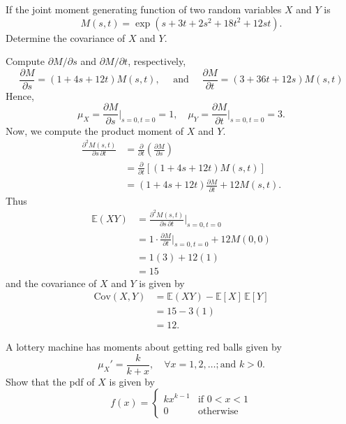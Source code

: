 \begin{example}
    If the joint moment generating function of two random variables $X$ and 
    $Y$ is 
    \[
        M(s, t) = \exp \left( s + 3t + 2s^2 + 18t^2 + 12st \right).
    \]
    Determine the covariance of $X$ and $Y$.
\end{example}
\begin{solution}
    Compute $\partial M/ \partial s$ and $\partial M/ \partial t$, respectively,
    \[
        \frac{\partial M}{\partial s} = (1 + 4s + 12t) M(s,t), \quad \text{ and } \quad 
        \frac{\partial M}{\partial t} = (3 + 36t + 12s) M(s,t)
    \]
    Hence, 
    \[
        \mu_X = \frac{\partial M}{\partial s} \big \vert_{s=0, t=0} = 1, \quad 
        \mu_Y = \frac{\partial M}{\partial t} \big \vert_{s=0, t=0} = 3.
    \]
    Now, we compute the product moment of $X$ and $Y$.
    \begin{align*}
        \frac{\partial^2 M(s,t)}{\partial s\, \partial t} &= 
        \frac{\partial}{\partial t} \left( \frac{\partial M}{\partial s} \right)\\
        &= \frac{\partial}{\partial t} \left[ (1 + 4s + 12t) M(s,t) \right]\\
        &= (1 + 4s + 12t) \frac{\partial M}{\partial t} + 12 M(s,t).
    \end{align*}
    Thus
    \begin{align*}
        \mathbb{E}(XY) &= \frac{\partial^2 M(s,t)}{\partial s\, \partial t} \bigg \vert_{s=0, t=0}\\ 
        &= 1 \cdot \frac{\partial M}{\partial t} \big \vert_{s=0, t=0} + 12 M(0,0)\\[0.5em]
        &= 1(3) + 12(1)\\
        &= 15
    \end{align*}
    and the covariance of $X$ and $Y$ is given by
    \begin{align*}
        \text{Cov}(X, Y) &= \mathbb{E}(XY) - \mathbb{E}[X] \, \mathbb{E}[Y]\\
        &= 15 - 3(1)\\
        &= 12.
    \end{align*}
\end{solution}

\begin{example}
    A lottery machine has moments about getting red balls given by
    \[
        \mu_X' = \frac{k}{k + x}, \quad \forall x = 1, 2, \ldots; 
        \text{and } k > 0.
    \]
    Show that the pdf of $X$ is given by 
    \[
        f(x) = \begin{cases}
            kx^{k-1} & \text{if } 0 < x < 1\\
            0 & \text{otherwise}
        \end{cases}
    \]
\end{example}

